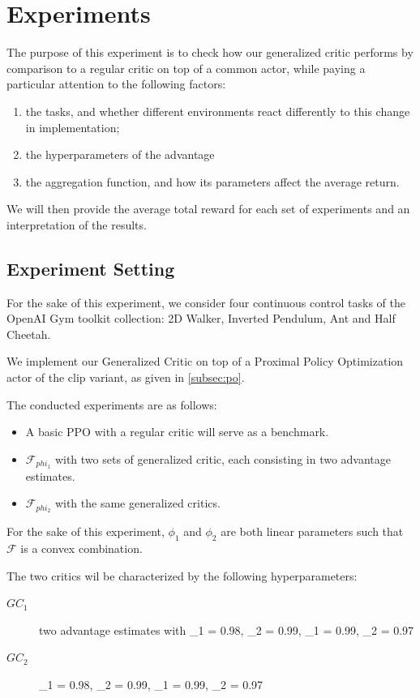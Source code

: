 \section{Experiments}
\label{sec:exp}

The purpose of this experiment is to check how our generalized critic performs by comparison to a regular critic on top of a common actor, while paying a particular attention to the following factors:
\begin{enumerate}
\item the tasks, and whether different environments react differently to this change in implementation;
\item the hyperparameters of the advantage
\item the aggregation function, and how its parameters affect the average return.
\end{enumerate}

We will then provide the average total reward for each set of experiments and an interpretation of the results.

\subsection{Experiment Setting}
For the sake of this experiment, we consider four continuous control tasks of the OpenAI Gym toolkit collection: 2D Walker, Inverted Pendulum, Ant and Half Cheetah. 

We implement our Generalized Critic on top of a Proximal Policy Optimization actor \cite{schulman2017proximal} of the clip variant, as given in \ref{subsec:po}.

The conducted experiments are as follows:
\begin{itemize}
\item A basic PPO with a regular critic will serve as a benchmark.
\item $\mathcal{F}_{phi_1}$ with two sets of generalized critic, each consisting in two advantage estimates.
\item $\mathcal{F}_{phi_2}$ with the same generalized critics.
\end{itemize}

For the sake of this experiment, $\phi_1$ and $\phi_2$ are both linear parameters such that $\mathcal{F}$ is a convex combination.

The two critics wil be characterized by the following hyperparameters:
\begin{description}
\item[$GC_1$] two advantage estimates with \lambda_1 = 0.98, \lambda_2 = 0.99, \gamma_1 = 0.99, \gamma_2 = 0.97
\item[$GC_2$] \lambda_1 = 0.98, \lambda_2 = 0.99, \gamma_1 = 0.99, \gamma_2 = 0.97
\end{description}

